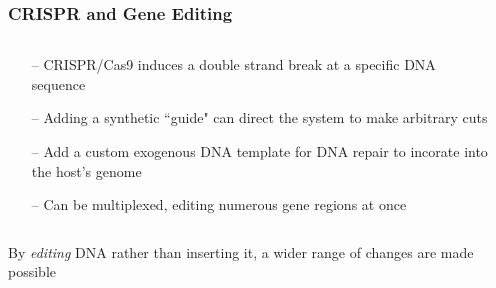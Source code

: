\documentclass[xcolor=dvipsnames]{beamer}
\begin{document}
\begin{frame}
	\frametitle{CRISPR and Gene Editing}
	
	
	\begin{columns}
		\begin{column}{0.5\textwidth}
			\begin{itemize}
				\item[--] CRISPR/Cas9 induces a double strand break at a specific DNA sequence
				\item[--] Adding a synthetic ``guide" can direct the system to make arbitrary cuts
				\item[--] Add a custom exogenous DNA template for DNA repair to incorate into the host's genome
				\item[--] Can be multiplexed, editing numerous gene regions at once
			\end{itemize}
		\end{column}
		\begin{column}{0.5\textwidth}
			\\
		\end{column}
	\end{columns}
	\vspace{10pt}	
	
	By \textit{editing} DNA rather than inserting it, a wider range of changes are made possible

\end{frame}
\end{document}

